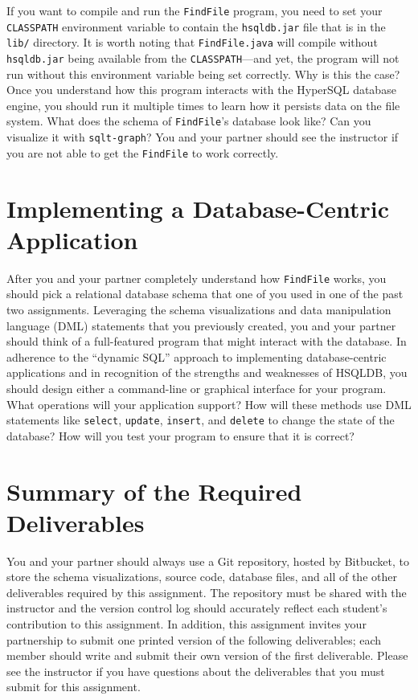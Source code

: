 If you want to compile and run the {\tt FindFile} program, you need to set your {\tt CLASSPATH} environment variable to
contain the {\tt hsqldb.jar} file that is in the {\tt lib/} directory. It is worth noting that {\tt FindFile.java} will
compile without {\tt hsqldb.jar} being available from the {\tt CLASSPATH}---and yet, the program will not run without
this environment variable being set correctly.  Why is this the case? Once you understand how this program interacts
with the HyperSQL database engine, you should run it multiple times to learn how it persists data on the file system.
What does the schema of {\tt FindFile}'s database look like? Can you visualize it with {\tt sqlt-graph}? You and your
partner should see the instructor if you are not able to get the {\tt FindFile} to work correctly.

\vspace*{-.05in}
\section*{Implementing a Database-Centric Application}

After you and your partner completely understand how {\tt FindFile} works, you should pick a relational database schema
that one of you used in one of the past two assignments. Leveraging the schema visualizations and data manipulation
language (DML) statements that you previously created, you and your partner should think of a full-featured program that
might interact with the database. In adherence to the ``dynamic SQL'' approach to implementing database-centric
applications and in recognition of the strengths and weaknesses of HSQLDB, you should design either a command-line or
graphical interface for your program. What operations will your application support? How will these methods use DML
statements like {\tt select}, {\tt update}, {\tt insert}, and {\tt delete} to change the state of the database? How will
you test your program to ensure that it is correct?

\section*{Summary of the Required Deliverables}

You and your partner should always use a Git repository, hosted by Bitbucket, to store the schema visualizations, source
code, database files, and all of the other deliverables required by this assignment. The repository must be shared with
the instructor and the version control log should accurately reflect each student's contribution to this assignment. In
addition, this assignment invites your partnership to submit one printed version of the following deliverables; each
member should write and submit their own version of the first deliverable. Please see the instructor if you have
questions about the deliverables that you must submit for this assignment.

